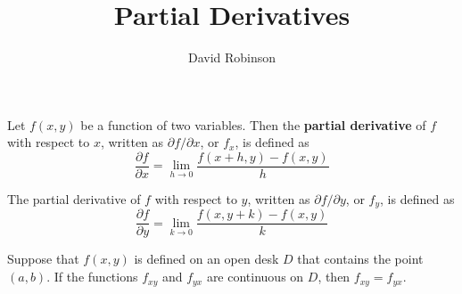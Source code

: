 \documentclass{article}
\title{Partial Derivatives}
\author{David Robinson}
\date{}
\begin{document}
\maketitle

Let $f(x, y)$ be a function of two variables. Then the \textbf{partial derivative} of $f$ with respect to $x$, written as $\partial f / \partial x$, or $f_x$, is defined as
\[\frac{\partial f}{\partial x}=\lim_{h\rightarrow 0} \frac{f(x+h,y)-f(x,y)}{h}\]

The partial derivative of $f$ with respect to $y$, written as $\partial f / \partial y$, or $f_y$, is defined as
\[\frac{\partial f}{\partial y}=\lim_{k\rightarrow 0}\frac{f(x,y+k)-f(x,y)}{k}\]

Suppose that $f(x, y)$ is defined on an open desk $D$ that contains the point $(a, b)$. If the functions $f_{xy}$ and $f_{yx}$ are continuous on $D$, then $f_{xy}=f_{yx}$.
\end{document}
